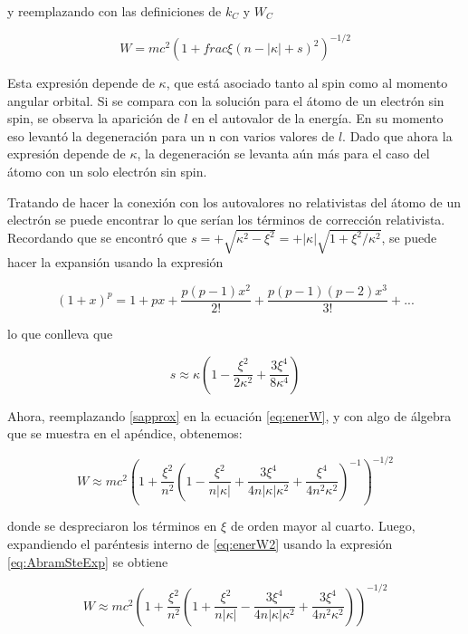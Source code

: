 \documentclass[a4paper, 12pt]{article} %
\begin{document}
y reemplazando con las definiciones de $k_C$ y $W_C$

\begin{equation}\label{eq:enerW}
W = mc^2 \left(1+frac{\xi}{(n-|\kappa|+s)^2} \right)^{-1/2}
\end{equation}

Esta expresi\'on depende de $\kappa$, que est\'a asociado tanto al spin como al momento angular orbital. Si se compara con la soluci\'on para el \'atomo de un electr\'on sin spin, se observa la aparici\'on de $l$ en el autovalor de la energ\'ia. En su momento eso levant\'o la degeneraci\'on para un n con varios valores de $l$. Dado que ahora la expresi\'on depende de $\kappa$, la degeneraci\'on se levanta a\'un m\'as para el caso del \'atomo con un solo electr\'on sin spin.

Tratando de hacer la conexi\'on con los autovalores no relativistas del \'atomo de un electr\'on se puede encontrar lo que ser\'ian los t\'erminos de correcci\'on relativista. Recordando que se encontr\'o que $s=+\sqrt{\kappa^2 - \xi^2}=+|\kappa|\sqrt{1+\xi^2/\kappa^2}$, se puede hacer la expansi\'on usando la expresi\'on

\begin{equation}\label{eq:AbramSteExp}
(1+x)^p =1+px+\frac{p(p-1)x^2}{2!}+\frac{p(p-1)(p-2)x^3}{3!}+...
\end{equation}

lo que conlleva que

\begin{equation}\label{sapprox}
s\approx \kappa \left( 1-\frac{\xi^2}{2\kappa^2}+\frac{3\xi^4}{8\kappa^4}  \right)
\end{equation}

Ahora, reemplazando \ref{sapprox} en la ecuaci\'on \ref{eq:enerW}, y con algo de \'algebra que se muestra en el ap\'endice, obtenemos:

\begin{equation}\label{eq:enerW2}
W \approx mc^2 \left( 1+ \frac{\xi^2}{n^2} \left( 1-\frac{\xi^2}{n|\kappa|} + \frac{3\xi^4}{4n|\kappa|\kappa^2} + \frac{\xi^4}{4n^2\kappa^2} \right)^{-1}  \right)^{-1/2}
\end{equation}

donde se despreciaron los t\'erminos en $\xi$ de orden mayor al cuarto. Luego, expandiendo el par\'entesis interno de \ref{eq:enerW2} usando la expresi\'on \ref{eq:AbramSteExp} se obtiene 


\begin{equation}\label{eq:enerW3}
W \approx mc^2 \left( 1+ \frac{\xi^2}{n^2} \left( 1 + \frac{\xi^2}{n|\kappa|} - \frac{3\xi^4}{4n|\kappa|\kappa^2} + \frac{3\xi^4}{4n^2\kappa^2} \right)  \right)^{-1/2}
\end{equation}
\end{document}
